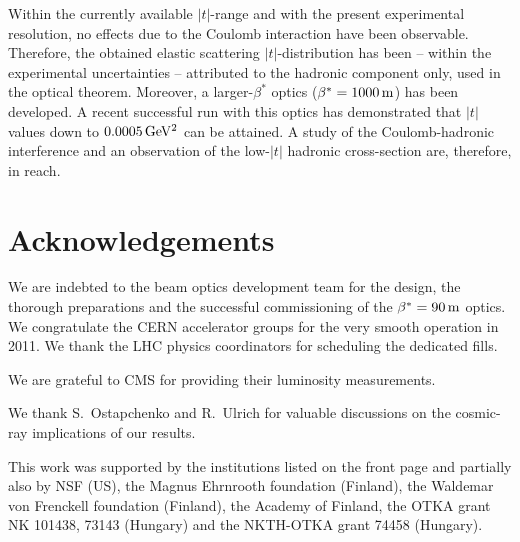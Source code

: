 \documentclass[TOTEM]{cern/cernphprep}
\def\un#1{\,{\rm #1}}
\def\acknowledgments{\section*{Acknowledgements}}
\begin{document}
Within the currently available $|t|$-range and with the present experimental resolution, no effects due to the Coulomb interaction have been observable. Therefore, the obtained elastic scattering $|t|$-distribution has been -- within the experimental uncertainties -- attributed to the hadronic component only, used in the optical theorem. Moreover, a larger-$\beta^*$ optics ($\beta^* = 1000\un{m}$) has been developed. A recent successful run with this optics has demonstrated that $|t|$ values down to $0.0005\un{GeV^2}$ can be attained. A study of the Coulomb-hadronic interference and an observation of the low-$|t|$ hadronic cross-section are, therefore, in reach.

\acknowledgments

We are indebted to the beam optics development team
for the design, the thorough preparations and the successful commissioning of the $\beta^* = 90\un{m}$ optics. We congratulate the CERN accelerator groups for the very smooth operation in 2011. We thank
the LHC physics coordinators for scheduling the dedicated fills.

We are grateful to CMS for providing their luminosity measurements.

We thank S.~Ostapchenko and R.~Ulrich for valuable discussions on the cosmic-ray implications of our results.

This work was supported by the institutions listed on the front page and partially also by NSF (US), the Magnus
Ehrnrooth foundation (Finland), the Waldemar von Frenckell foundation (Finland), the Academy of
Finland, the OTKA grant NK 101438, 73143 (Hungary) and the NKTH-OTKA grant 74458 (Hungary).
\end{document}

